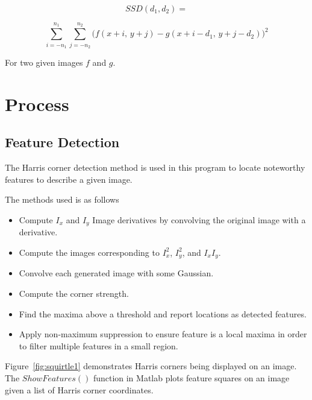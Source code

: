 \documentclass[12pt,journal,compsoc]{IEEEtran}
\begin{document}
$$
SSD(d_1,d_2) =
$$

$$
\sum_{i=-n_1}^{n_1} \sum_{j=-n_2}^{n_2}
\big(f(x+i,\,y+j)-g(x+i-d_1,\,y+j-d_2)\big)^2
$$

For two given images $f$ and $g$.


\section{Process}

\subsection{Feature Detection}
The Harris corner detection method is used in this program to locate noteworthy features to describe a given image.

The methods used is as follows
\begin{itemize}
	\item Compute $I_{x}$ and $I_{y}$ Image derivatives by convolving the original image with a derivative.
	\item Compute the images corresponding to $I_{x}^{2}$, $I_{y}^{2}$, and $I_{x}I_{y}$.
	\item Convolve each generated image with some Gaussian.
	\item Compute the corner strength.
	\item Find the maxima above a threshold and report locations as detected features.
	\item Apply non-maximum suppression to ensure feature is a local maxima in order to filter multiple features in a small region.
\end{itemize}

Figure~\ref{fig:squirtle1} demonstrates Harris corners being displayed on an image. The $ShowFeatures()$ function in Matlab plots feature squares on an image given a list of Harris corner coordinates.
\end{document}
